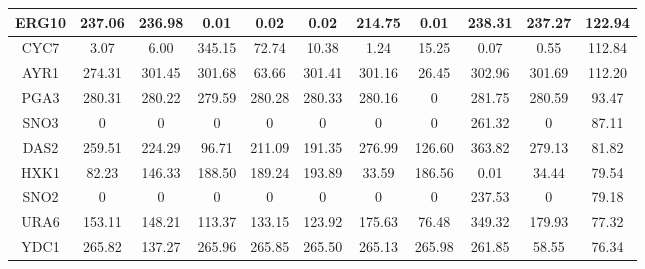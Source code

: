 \begin{table}[H]
\begin{center}
{\begin{tabular}{|c|c|c|c|c|c|c|c|c|c|c|}
ERG10           & 237.06             & 236.98             & 0.01              & 0.02                       & 0.02          & 214.75          & 0.01                   & 238.31          & 237.27            & 122.94       \\ \hline
CYC7            & 3.07               & 6.00               & 345.15            & 72.74                      & 10.38         & 1.24            & 15.25                  & 0.07            & 0.55              & 112.84       \\ \hline
AYR1            & 274.31             & 301.45             & 301.68            & 63.66                      & 301.41        & 301.16          & 26.45                  & 302.96          & 301.69            & 112.20       \\ \hline
PGA3            & 280.31             & 280.22             & 279.59            & 280.28                     & 280.33        & 280.16          & 0                      & 281.75          & 280.59            & 93.47        \\ \hline
SNO3            & 0                  & 0                  & 0                 & 0                          & 0             & 0               & 0                      & 261.32          & 0                 & 87.11        \\ \hline
DAS2            & 259.51             & 224.29             & 96.71             & 211.09                     & 191.35        & 276.99          & 126.60                 & 363.82          & 279.13            & 81.82        \\ \hline
HXK1            & 82.23              & 146.33             & 188.50            & 189.24                     & 193.89        & 33.59           & 186.56                 & 0.01            & 34.44             & 79.54        \\ \hline
SNO2            & 0                  & 0                  & 0                 & 0                          & 0             & 0               & 0                      & 237.53          & 0                 & 79.18        \\ \hline
URA6            & 153.11             & 148.21             & 113.37            & 133.15                     & 123.92        & 175.63          & 76.48                  & 349.32          & 179.93            & 77.32        \\ \hline
YDC1            & 265.82             & 137.27             & 265.96            & 265.85                     & 265.50        & 265.13          & 265.98                 & 261.85          & 58.55             & 76.34        \\ \hline

\end{tabular}}
\end{center}
\end{table}
